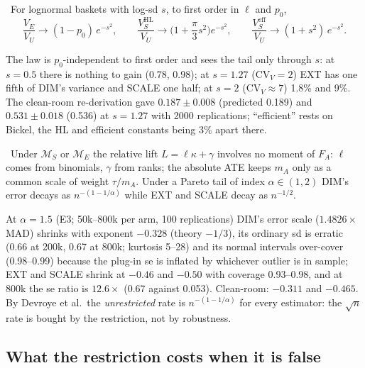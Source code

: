 \begin{law}
\label{ht:law:ratio}
\tagEstablished\ For lognormal baskets with log-sd $s$, to first order in $\ell$ and $p_0$,
\begin{equation}
\frac{V_E}{V_U} \to (1 - p_0)\,e^{-s^2}, \qquad
\frac{V_S^{\mathrm{HL}}}{V_U} \to \Big(1 + \frac{\pi}{3}s^2\Big)e^{-s^2}, \qquad
\frac{V_S^{\mathrm{eff}}}{V_U} \to (1 + s^2)\,e^{-s^2}.
\label{eq:ht:law}
\end{equation}
\end{law}

The law is $p_0$-independent to first order and sees the tail only through $s$: at $s = 0.5$ there is nothing to gain (0.78, 0.98); at $s = 1.27$ ($\mathrm{CV}_V = 2$) EXT has one fifth of DIM's variance and SCALE one half; at $s = 2$ ($\mathrm{CV}_V \approx 7$) 1.8\% and 9\%. The clean-room re-derivation gave $0.187 \pm 0.008$ (predicted 0.189) and $0.531 \pm 0.018$ (0.536) at $s = 1.27$ with 2000 replications; ``efficient'' rests on Bickel, the HL and efficient constants being 3\% apart there.

\begin{proposition}
\label{ht:prop:tailfree}
\tagEstablished\ Under $\mathcal M_S$ or $\mathcal M_E$ the relative lift $L = \ell\kappa + \gamma$ involves no moment of $F_A$: $\ell$ comes from binomials, $\gamma$ from ranks; the absolute ATE keeps $m_A$ only as a common scale of weight $\tau/m_A$. Under a Pareto tail of index $\alpha \in (1, 2)$ DIM's error decays as $n^{-(1 - 1/\alpha)}$ while EXT and SCALE decay as $n^{-1/2}$.
\end{proposition}

At $\alpha = 1.5$ (E3; 50k--800k per arm, 100 replications) DIM's error scale ($1.4826\times$MAD) shrinks with exponent $-0.328$ (theory $-1/3$), its ordinary sd is erratic (0.66 at 200k, 0.67 at 800k; kurtosis 5--28) and its normal intervals over-cover (0.98--0.99) because the plug-in se is inflated by whichever outlier is in sample; EXT and SCALE shrink at $-0.46$ and $-0.50$ with coverage 0.93--0.98, and at 800k the se ratio is $12.6\times$ (0.67 against 0.053). Clean-room: $-0.311$ and $-0.465$. By Devroye et al.\ the \emph{unrestricted} rate is $n^{-(1 - 1/\alpha)}$ for every estimator: the $\sqrt n$ rate is bought by the restriction, not by robustness.

\subsection{What the restriction costs when it is false}

